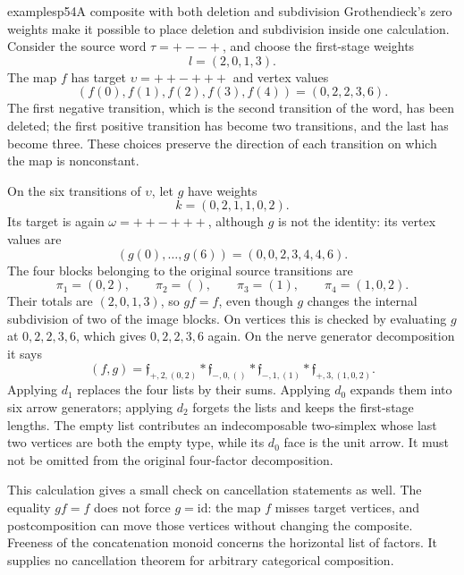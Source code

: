 \begin{dcomment}{examples}{p54}{A composite with both deletion and subdivision}
Grothendieck's zero weights make it possible to place deletion and subdivision inside one calculation. Consider the source word $\tau=+--+$, and choose the first-stage weights
\[
 l=(2,0,1,3).
\]
The map $f$ has target $\upsilon=++-+++$ and vertex values
\[
 (f(0),f(1),f(2),f(3),f(4))=(0,2,2,3,6).
\]
The first negative transition, which is the second transition of the word, has been deleted; the first positive transition has become two transitions, and the last has become three. These choices preserve the direction of each transition on which the map is nonconstant.

On the six transitions of $\upsilon$, let $g$ have weights
\[
 k=(0,2,1,1,0,2).
\]
Its target is again $\omega=++-+++$, although $g$ is not the identity: its vertex values are
\[
 (g(0),\ldots,g(6))=(0,0,2,3,4,4,6).
\]
The four blocks belonging to the original source transitions are
\[
 \pi_1=(0,2),\qquad \pi_2=(),\qquad
 \pi_3=(1),\qquad \pi_4=(1,0,2).
\]
Their totals are $(2,0,1,3)$, so $gf=f$, even though $g$ changes the internal subdivision of two of the image blocks. On vertices this is checked by evaluating $g$ at $0,2,2,3,6$, which gives $0,2,2,3,6$ again. On the nerve generator decomposition it says
\[
 (f,g)=
 \mathfrak f_{+,2,(0,2)}*
 \mathfrak f_{-,0,()}*
 \mathfrak f_{-,1,(1)}*
 \mathfrak f_{+,3,(1,0,2)}.
\]
Applying $d_1$ replaces the four lists by their sums. Applying $d_0$ expands them into six arrow generators; applying $d_2$ forgets the lists and keeps the first-stage lengths. The empty list contributes an indecomposable two-simplex whose last two vertices are both the empty type, while its $d_0$ face is the unit arrow. It must not be omitted from the original four-factor decomposition.

This calculation gives a small check on cancellation statements as well. The equality $gf=f$ does not force $g=\mathrm{id}$: the map $f$ misses target vertices, and postcomposition can move those vertices without changing the composite. Freeness of the concatenation monoid concerns the horizontal list of factors. It supplies no cancellation theorem for arbitrary categorical composition.
\end{dcomment}


